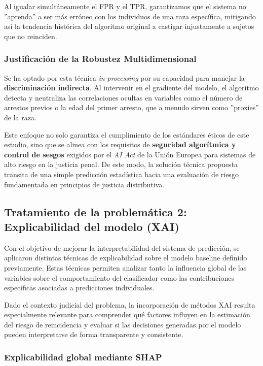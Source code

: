 \documentclass[11pt,a4paper]{article}
\begin{document}
Al igualar simultáneamente el FPR y el TPR, garantizamos que el sistema no ''aprenda'' a ser más erróneo con los individuos de una raza específica, mitigando así la tendencia histórica del algoritmo original a castigar injustamente a sujetos que no reinciden.

\subsubsection{Justificación de la Robustez Multidimensional}

Se ha optado por esta técnica \textit{in-processing} por su capacidad para manejar la \textbf{discriminación indirecta}. Al intervenir en el gradiente del modelo, el algoritmo detecta y neutraliza las correlaciones ocultas en variables como el número de arrestos previos o la edad del primer arresto, que a menudo sirven como ''proxies'' de la raza. 

Este enfoque no solo garantiza el cumplimiento de los estándares éticos de este estudio, sino que se alinea con los requisitos de \textbf{seguridad algorítmica y control de sesgos} exigidos por el \textit{AI Act} de la Unión Europea para sistemas de alto riesgo en la justicia penal. De este modo, la solución técnica propuesta transita de una simple predicción estadística hacia una evaluación de riesgo fundamentada en principios de justicia distributiva.



\subsection{Tratamiento de la problemática 2: Explicabilidad del modelo (XAI)}

Con el objetivo de mejorar la interpretabilidad del sistema de predicción, se aplicaron distintas técnicas de explicabilidad sobre el modelo baseline definido previamente. Estas técnicas permiten analizar tanto la influencia global de las variables sobre el comportamiento del clasificador como las contribuciones específicas asociadas a predicciones individuales.

Dado el contexto judicial del problema, la incorporación de métodos XAI resulta especialmente relevante para comprender qué factores influyen en la estimación del riesgo de reincidencia y evaluar si las decisiones generadas por el modelo pueden interpretarse de forma transparente y consistente.

\subsubsection{Explicabilidad global mediante SHAP}
\end{document}
